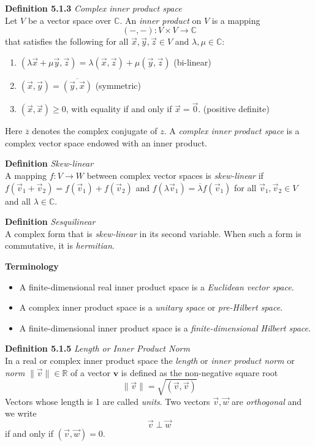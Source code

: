 \documentclass[8pt,landscape]{article}
\begin{document}
\begin{multicols}{3}
    \textbf{Definition 5.1.3} \emph{Complex inner product space} \\
    Let $V$ be a vector space over $\mathbb{C}$.
    An \emph{inner product} on $V$ is a mapping
    \[
        (-, -) : V \times V \to \mathbb{C}
    \]
    that satisfies the following for all $\vec{x}, \vec{y}, \vec{z} \in V$
    and $\lambda, \mu \in \mathbb{C}$:
    \begin{enumerate}
        \item $(\lambda \vec{x} + \mu \vec{y}, \vec{z}) =
            \lambda(\vec{x}, \vec{z}) + \mu(\vec{y}, \vec{z})$
            \quad (bi-linear)
        \item $(\vec{x}, \vec{y}) = \overline{(\vec{y}, \vec{x})}$
            \quad (symmetric)
        \item $(\vec{x}, \vec{x}) \geq 0$,
            with equality if and only if $\vec{x} = \vec{0}$.
            \quad (positive definite)
    \end{enumerate}
    Here $\overline{z}$ denotes the complex conjugate of $z$.
    A \emph{complex inner product space} is a complex vector space endowed with an inner
    product.

    \textbf{Definition} \emph{Skew-linear} \\
    A mapping $f : V \to W$ between complex vector spaces is \emph{skew-linear}
    if $f(\vec{v}_1 + \vec{v}_2) = f(\vec{v}_1) + f(\vec{v}_2)$
    and $f(\lambda \vec{v}_1) = \overline{\lambda} f(\vec{v}_1)$
    for all $\vec{v}_1, \vec{v}_2 \in V$ and all $\lambda \in \mathbb{C}$.

    \textbf{Definition} \emph{Sesquilinear} \\
    A complex form that is \emph{skew-linear} in its second variable.
    When such a form is commutative, it is \emph{hermitian}.

    \textbf{Terminology}
    \begin{itemize}
        \item A finite-dimensional real inner product space is a
            \emph{Euclidean vector space}.
        \item A complex inner product space is a \emph{unitary space}
            or \emph{pre-Hilbert space}.
        \item A finite-dimensional inner product space is a
            \emph{finite-dimensional Hilbert space}.
    \end{itemize}

    \textbf{Definition 5.1.5} \emph{Length or Inner Product Norm} \\
    In a real or complex inner product space the \emph{length} or \emph{inner product norm}
    or \emph{norm} $\lVert \vec{v} \rVert \in \mathbb{R}$ of a vector $\textbf{v}$
    is defined as the non-negative square root
    \[
        \lVert \vec{v} \rVert = \sqrt{(\vec{v}, \vec{v})}
    \]
    Vectors whose length is 1 are called \emph{units}.
    Two vectors $\vec{v}, \vec{w}$ are \emph{orthogonal} and we write
    \[
        \vec{v} \perp \vec{w}
    \]
    if and only if $(\vec{v}, \vec{w}) = 0$.


\end{multicols}
\end{document}
